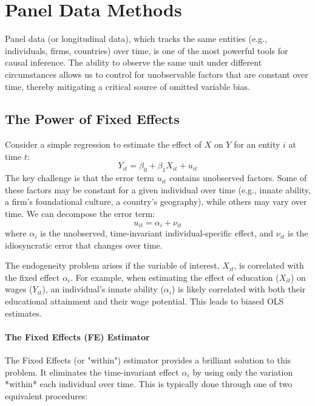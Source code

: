 \documentclass{article}
\begin{document}
\section{Panel Data Methods}
\label{sec:panel_data}

Panel data (or longitudinal data), which tracks the same entities (e.g., individuals, firms, countries) over time, is one of the most powerful tools for causal inference. The ability to observe the same unit under different circumstances allows us to control for unobservable factors that are constant over time, thereby mitigating a critical source of omitted variable bias.

\subsection{The Power of Fixed Effects}
\label{sub:fixed_effects}

Consider a simple regression to estimate the effect of $X$ on $Y$ for an entity $i$ at time $t$:
\begin{equation}
    Y_{it} = \beta_0 + \beta_1 X_{it} + u_{it}
\end{equation}
The key challenge is that the error term $u_{it}$ contains unobserved factors. Some of these factors may be constant for a given individual over time (e.g., innate ability, a firm's foundational culture, a country's geography), while others may vary over time. We can decompose the error term:
\begin{equation}
    u_{it} = \alpha_i + \nu_{it}
\end{equation}
where $\alpha_i$ is the unobserved, time-invariant individual-specific effect, and $\nu_{it}$ is the idiosyncratic error that changes over time.

The endogeneity problem arises if the variable of interest, $X_{it}$, is correlated with the fixed effect $\alpha_i$. For example, when estimating the effect of education ($X_{it}$) on wages ($Y_{it}$), an individual's innate ability ($\alpha_i$) is likely correlated with both their educational attainment and their wage potential. This leads to biased OLS estimates.

\paragraph{The Fixed Effects (FE) Estimator}
The Fixed Effects (or "within") estimator provides a brilliant solution to this problem. It eliminates the time-invariant effect $\alpha_i$ by using only the variation *within* each individual over time. This is typically done through one of two equivalent procedures:
\end{document}
